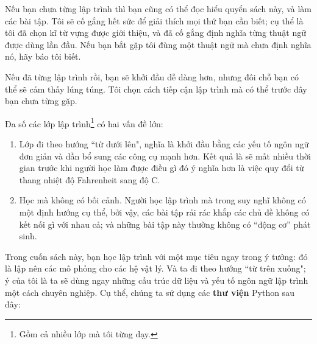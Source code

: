 \documentclass[12pt, openany]{book}
\theoremstyle{exercise}
\begin{document}
Nếu bạn chưa từng lập trình thì bạn cũng có thể đọc hiểu quyển sách này, và làm các bài tập. Tôi sẽ cố gắng hết sức để giải thích mọi thứ bạn cần biết; cụ thể là tôi đã chọn kĩ từ vựng được giới thiệu, và đã cố gắng định nghĩa từng thuật ngữ được dùng lần đầu. Nếu bạn bắt gặp tôi đùng một thuật ngữ mà chưa định nghĩa nó, hãy báo tôi biết.

Nếu đã từng lập trình rồi, bạn sẽ khởi đầu dễ dàng hơn, nhưng đôi chỗ bạn có thể sẽ cảm thấy lúng túng. Tôi chọn cách tiếp cận lập trình mà có thể trước đây bạn chưa từng gặp.

Đa số các lớp lập trình\footnote{Gồm cả nhiều lớp mà tôi từng dạy.} có hai vấn đề lớn:

\begin{enumerate}

\item Lớp đi theo hướng ``từ dưới lên", nghĩa là khởi đầu bằng các yếu tố ngôn ngữ đơn giản và dần bổ sung các công cụ mạnh hơn. Kết quả là sẽ mất nhiều thời gian trước khi người học làm được điều gì đó ý nghĩa hơn là việc quy đổi từ thang nhiệt độ Fahrenheit sang độ C.


\item Học mà không có bối cảnh. Người học lập trình mà trong suy nghĩ không có một định hướng cụ thể, bởi vậy, các bài tập rải rác khắp các chủ đề không có kết nối gì với nhau cả; và những bài tập này thường không có ``động cơ'' phát sinh.

\end{enumerate}

Trong cuốn sách này, bạn học lập trình với một mục tiêu ngay trong ý tưởng: đó là lập nên các mô phỏng cho các hệ vật lý. Và ta đi theo hướng ``từ trên xuống"; ý của tôi là ta sẽ dùng ngay những cấu trúc dữ liệu và yếu tố ngôn ngữ lập trình một cách chuyên nghiệp. Cụ thể, chúng ta sử dụng các {\bf thư viện} Python sau đây:

\end{document}
